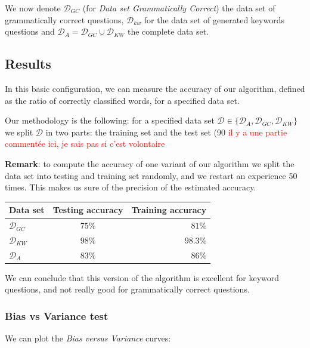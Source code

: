 We now denote $\mathcal{D}_{GC}$ (for \textit{Data set Grammatically Correct}) the data set of grammatically correct questions, $\mathcal{D}_{kw}$ for the data set of generated keywords questions and $\mathcal{D}_A = \mathcal{D}_{GC} \cup  \mathcal{D}_{KW}$ the complete data set.

\subsection{Results}

In this basic configuration, we can measure the accuracy of our algorithm, defined as the ratio of correctly classified words, for a specified data set.

Our methodology is the following: for a specified data set $\mathcal{D} \in \{\mathcal{D}_A, \mathcal{D}_{GC}, \mathcal{D}_{KW}\}$ we split $\mathcal{D}$ in two parts: the training set and the test set (90%
\textcolor{red}{il y a une partie commentée ici, je sais pas si c'est volontaire}

\textbf{Remark}: to compute the accuracy of one variant of our algorithm we split the data set into testing and training set randomly, and we restart an experience 50 times. This makes us sure of the precision of the estimated accuracy.

\begin{center}
\begin{tabular}{|l|c|r|}
  \hline
  Data set &  Testing accuracy  & Training accuracy \\
  \hline
  $\mathcal{D}_{GC}$ &  $75\%$& $81\%$  \\
  $\mathcal{D}_{KW}$ & $98\%$ & $98.3\%$ \\
  $\mathcal{D}_{A}$    & $83\%$ & $86\%$ \\
  \hline
\end{tabular}
\end{center}

We can conclude that this version of the algorithm is excellent for keyword questions, and not really good for grammatically correct questions.

\subsubsection{Bias vs Variance test}

We can plot the \textit{Bias versus Variance} curves:


